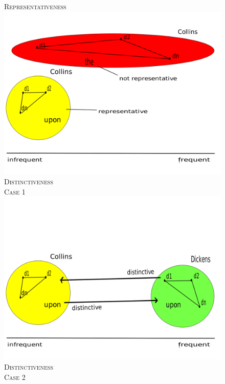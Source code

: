 \documentclass[a4paper,10pt,twoside,fleqn]{article}
\begin{document}
\begin{figure}[!htb]
\sf \textsc{Representativeness}
  \includegraphics[scale=0.2,width=\linewidth]{figures/repres1-fin.png}
  \endminipage\hfill
{}
\sf \textsc{Distinctiveness} \\
{\scriptsize \textsc{Case 1}}\\
  \includegraphics[scale=0.2,width=\linewidth]{figures/distinc1-fin.png}
\endminipage\hfill
{}%
\sf \textsc{Distinctiveness} \\
{\scriptsize \textsc{Case 2}}\\

\end{figure}
\end{document}
